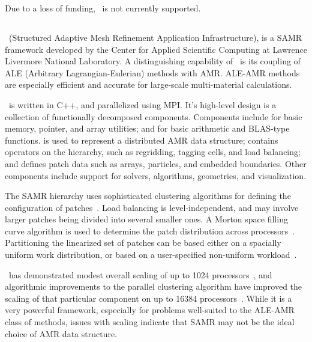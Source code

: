 \documentclass[10pt,twocolumn]{article}
\begin{document}
Due to a loss of funding, \paramesh\ is not currently supported.


\subsection{\samrai} \label{ss:samrai}

\samrai\ (Structured Adaptive Mesh Refinement Application
Infrastructure), is a SAMR framework developed by the Center for
Applied Scientific Computing at Lawrence Livermore National
Laboratory.  A distinguishing capability of \samrai\ is its coupling
of ALE (Arbitrary Lagrangian-Eulerian) methods with AMR.  ALE-AMR
methods are especially efficient and accurate for large-scale
multi-material calculations.

\samrai\ is written in C++, and parallelized using MPI.  It's
high-level design is a collection of functionally decomposed
components.  Components include  for basic memory,
pointer, and array utilities; and  for basic
arithmetic and BLAS-type functions.   is used to
represent a distributed AMR data structure;  contains
operators on the hierarchy, such as regridding, tagging cells, and
load balancing; and  defines patch data such as
arrays, particles, and embedded boundaries.  Other components include
support for solvers, algorithms, geometries,  and visualization.

The SAMR hierarchy uses sophisticated clustering algorithms for
defining the configuration of patches~\cite{GuWi06}.  Load balancing
is level-independent, and may involve larger patches being divided
into several smaller ones.  A Morton space filling curve algorithm is
used to determine the patch distribution across
processors~\cite{WiHo01}.  Partitioning the linearized set of patches
can be based either on a spacially uniform work distribution, or based
on a user-specified non-uniform workload~\cite{wwwsamraicode}.

\samrai\ has demonstrated modest overall scaling of up to 1024
processors~\cite{WiHy03}, and algorithmic improvements to the parallel
clustering algorithm have improved the scaling of that particular
component on up to 16384 processors~\cite{GuWi06}.  While it is a very
powerful framework, especially for problems well-suited to the ALE-AMR
class of methods, issues with scaling indicate that SAMR may not be the
ideal choice of AMR data structure.
\end{document}
